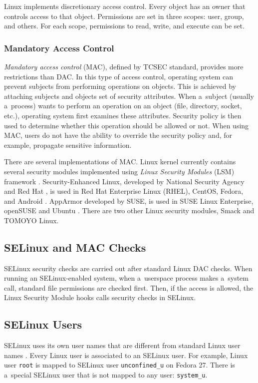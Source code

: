 Linux implements discretionary access control. Every object has an owner that
controls access to that object. Permissions are set in three scopes: user,
group, and others. For each scope, permissions to read, write, and execute can
be set.

\subsubsection{Mandatory Access Control}
\emph{Mandatory access control} (MAC), defined by TCSEC standard, provides more
restrictions than DAC. In this type of access control, operating system can
prevent subjects from performing operations on objects. This is achieved by
attaching subjects and objects set of security attributes. When a~subject
(usually a~process) wants to perform an operation on an object (file, directory,
socket, etc.), operating system first examines these attributes. Security
policy is then used to determine whether this operation should be allowed or
not. When using MAC, users do not have the ability to override the security
policy and, for example, propagate sensitive information.

There are several implementations of MAC. Linux kernel currently contains
several security modules implemented using \emph{Linux Security Modules} (LSM)
framework \cite{lsmusage}. Security-Enhanced Linux, developed by National
Security Agency and Red Hat \cite{selinuxcontr}, is used in Red Hat Enterprise
Linux (RHEL), CentOS, Fedora, and Android
\cite{selinuxguide,selinuxguidefedora,selinuxandroid}. AppArmor developed by
SUSE, is used in SUSE Linux Enterprise, openSUSE and Ubuntu
\cite{apparmor,apparmorubuntu}. There are two other Linux security modules,
Smack and TOMOYO Linux.

\subsection{SELinux and MAC Checks}
SELinux security checks are carried out after standard Linux DAC checks. When
running an SELinux-enabled system, when a~userspace process makes a~system call,
standard file permissions are checked first. Then, if the access is allowed, the
Linux Security Module hooks calls security checks in SELinux.

\subsection{SELinux Users}
\label{selinuxuser}
SELinux uses its own user names that are different from standard Linux user
names \cite[p.~24]{tsn}. Every Linux user is associated to an SELinux user. For
example, Linux user \texttt{root} is mapped to SELinux user
\texttt{unconfined\_u} on Fedora 27. There is a~special SELinux user that is
not mapped to any user: \texttt{system\_u}.

